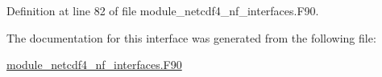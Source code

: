 Definition at line 82 of file module\+\_\+netcdf4\+\_\+nf\+\_\+interfaces.\+F90.



The documentation for this interface was generated from the following file\+:\begin{DoxyCompactItemize}
\item 
\hyperlink{module__netcdf4__nf__interfaces_8F90}{module\+\_\+netcdf4\+\_\+nf\+\_\+interfaces.\+F90}\end{DoxyCompactItemize}
